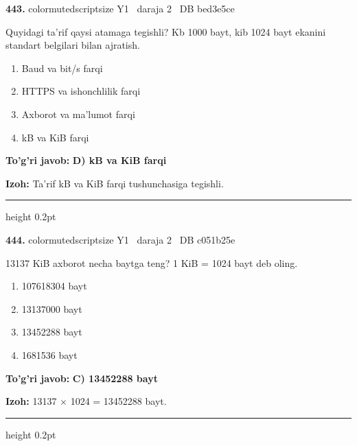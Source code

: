 \documentclass[10pt,a4paper,oneside]{article}
\begin{document}
\noindent\textbf{\color{ink}443.}  {color{muted}scriptsize Y1 \textbullet\ daraja 2 \textbullet\ DB bed3e5ce}
\par
Quyidagi ta'rif qaysi atamaga tegishli? Kb 1000 bayt, kib 1024 bayt ekanini standart belgilari bilan ajratish.
\begin{enumerate}[label=\Alph*),leftmargin=9mm]
\item Baud va bit/s farqi
\item HTTPS va ishonchlilik farqi
\item Axborot va ma'lumot farqi
\item kB va KiB farqi
\end{enumerate}
\begin{tcolorbox}[enhanced,breakable,colback=teal!4,colframe=teal!50!black,boxrule=0.5pt,arc=1.1mm,left=3mm,right=3mm,top=1.7mm,bottom=1.7mm,before skip=2mm,after skip=2mm]
\textbf{\color{teal}To'g'ri javob:} \textbf{D) kB va KiB farqi}
\par\smallskip
\textbf{Izoh:} Ta'rif kB va KiB farqi tushunchasiga tegishli.
\end{tcolorbox}
\vspace{2mm}\hrule height 0.2pt \vspace{3mm}

\noindent\textbf{\color{ink}444.}  {color{muted}scriptsize Y1 \textbullet\ daraja 2 \textbullet\ DB c051b25e}
\par
13137 KiB axborot necha baytga teng? 1 KiB = 1024 bayt deb oling.
\begin{enumerate}[label=\Alph*),leftmargin=9mm]
\item 107618304 bayt
\item 13137000 bayt
\item 13452288 bayt
\item 1681536 bayt
\end{enumerate}
\begin{tcolorbox}[enhanced,breakable,colback=teal!4,colframe=teal!50!black,boxrule=0.5pt,arc=1.1mm,left=3mm,right=3mm,top=1.7mm,bottom=1.7mm,before skip=2mm,after skip=2mm]
\textbf{\color{teal}To'g'ri javob:} \textbf{C) 13452288 bayt}
\par\smallskip
\textbf{Izoh:} 13137 \ensuremath{\times} 1024 = 13452288 bayt.
\end{tcolorbox}
\vspace{2mm}\hrule height 0.2pt \vspace{3mm}
\end{document}
